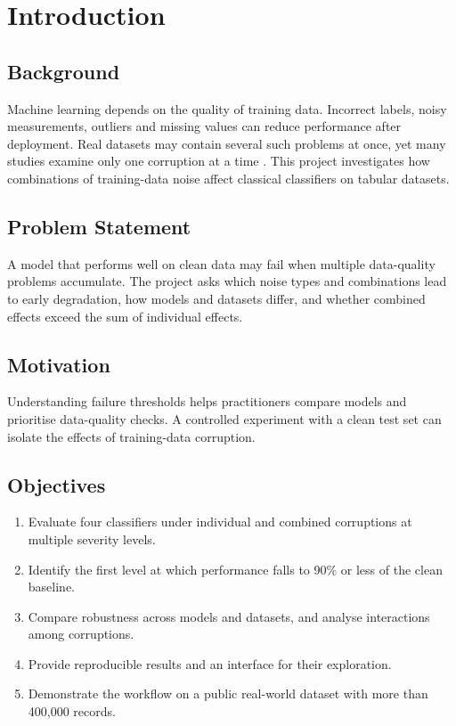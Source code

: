 \chapter{Introduction}
\section{Background}
Machine learning depends on the quality of training data. Incorrect labels, noisy measurements, outliers and missing values can reduce performance after deployment. Real datasets may contain several such problems at once, yet many studies examine only one corruption at a time \cite{frenay2014classification,song2023survey}. This project investigates how combinations of training-data noise affect classical classifiers on tabular datasets.
\section{Problem Statement}
A model that performs well on clean data may fail when multiple data-quality problems accumulate. The project asks which noise types and combinations lead to early degradation, how models and datasets differ, and whether combined effects exceed the sum of individual effects.
\section{Motivation}
Understanding failure thresholds helps practitioners compare models and prioritise data-quality checks. A controlled experiment with a clean test set can isolate the effects of training-data corruption.
\section{Objectives}
\begin{enumerate}[nosep]
\item Evaluate four classifiers under individual and combined corruptions at multiple severity levels.
\item Identify the first level at which performance falls to 90\% or less of the clean baseline.
\item Compare robustness across models and datasets, and analyse interactions among corruptions.
\item Provide reproducible results and an interface for their exploration.
\item Demonstrate the workflow on a public real-world dataset with more than 400,000 records.
\end{enumerate}

